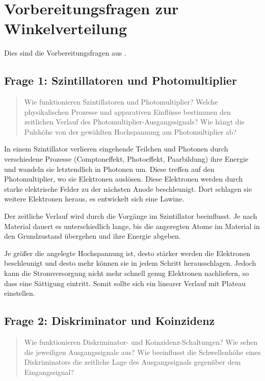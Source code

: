 \documentclass[11pt, ngerman, fleqn, DIV=15, headinclude, BCOR=2cm]{scrreprt}
\begin{document}
\section{Vorbereitungsfragen zur Winkelverteilung}

Dies sind die Vorbereitungsfragen aus \parencite[11]{physik512-Anleitung}.

\subsection{Frage 1: Szintillatoren und Photomultiplier}
\label{sec:frage1-1}

\begin{quote}
    Wie funktionieren Szintillatoren und Photomultiplier? Welche
    physikalischen Prozesse und apparativen Einflüsse bestimmen den
    zeitlichen Verlauf des Photomultiplier-Ausgangssignals? Wie hängt die
    Pulshöhe von der gewählten Hochspannung am Photomultiplier ab?
\end{quote}

In einem Szintillator verlieren eingehende Teilchen und Photonen durch
verschiedene Prozesse (Comptoneffekt, Photoeffekt, Paarbildung) ihre Energie
und wandeln sie letztendlich in Photonen um. Diese treffen auf den
Photomultiplier, wo sie Elektronen auslösen. Diese Elektronen werden durch
starke elektrische Felder zu der nächsten Anode beschleunigt. Dort schlagen sie
weitere Elektronen heraus, es entwickelt sich eine Lawine.

Der zeitliche Verlauf wird durch die Vorgänge im Szintillator beeinflusst. Je
nach Material dauert es unterschiedlich lange, bis die angeregten Atome im
Material in den Grundzustand übergehen und ihre Energie abgeben.

Je größer die angelegte Hochspannung ist, desto stärker werden die Elektronen
beschleunigt und desto mehr können sie in jedem Schritt herausschlagen. Jedoch
kann die Stromversorgung nicht mehr schnell genug Elektronen nachliefern, so
dass eine Sättigung eintritt. Somit sollte sich ein linearer Verlauf mit
Plateau einstellen.

\subsection{Frage 2: Diskriminator und Koinzidenz}

\begin{quote}
    Wie funktionieren Diskriminator- und Koinzidenz-Schaltungen? Wie sehen die
    jeweiligen Ausgangssignale aus? Wie beeinflusst die Schwellenhöhe eines
    Diskriminators die zeitliche Lage des Ausgangssignals gegenüber dem
    Eingangssignal?
\end{quote}
\end{document}
